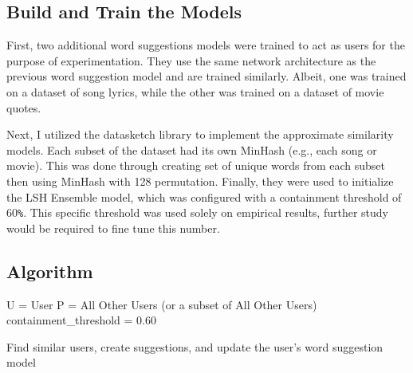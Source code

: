 \documentclass[sigconf]{acmart}
\begin{document}
\subsection{Build and Train the Models}
First, two additional word suggestions models were trained to act as users for the purpose of experimentation. They use the same network architecture as the previous word suggestion model and are trained similarly. Albeit, one was trained on a dataset of song lyrics, while the other was trained on a dataset of movie quotes.

Next, I utilized the datasketch library to implement the approximate similarity models. Each subset of the dataset had its own MinHash (e.g., each song or movie). This was done through creating set of unique words from each subset then using MinHash with 128 permutation. Finally, they were used to initialize the LSH Ensemble model, which was configured with a containment threshold of 60\lstinline{%}. This specific threshold was used solely on empirical results, further study would be required to fine tune this number.

\subsection{Algorithm}

\begin{algorithm}
    \SetAlgoLined
    U = User\;
    P = All Other Users (or a subset of All Other Users)\;
    containment\_threshold = 0.60\;
     \caption{Find similar users, create suggestions, and update the user's word suggestion model}
\end{algorithm}
\end{document}
